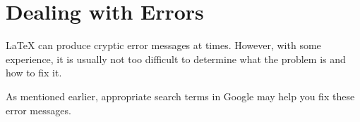 \chapter{Dealing with Errors}
\label{chap:errors}

\LaTeX{} can produce cryptic error messages at times.
However, with some experience, it is usually not too
difficult to determine what the problem is and how to fix it.

As mentioned earlier, appropriate search terms in Google
may help you fix these error messages.

